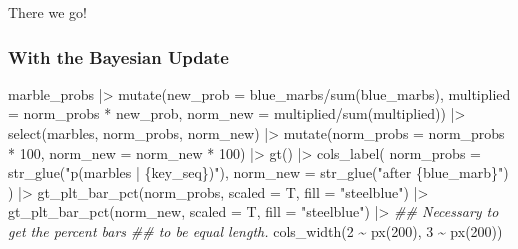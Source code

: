 \documentclass[
  letterpaper,
  DIV=11,
  numbers=noendperiod]{scrartcl}
\newenvironment{Shaded}{\begin{snugshade}}{\end{snugshade}}
\newcommand{\AttributeTok}[1]{\textcolor[rgb]{0.40,0.45,0.13}{#1}}
\newcommand{\DecValTok}[1]{\textcolor[rgb]{0.68,0.00,0.00}{#1}}
\newcommand{\DocumentationTok}[1]{\textcolor[rgb]{0.37,0.37,0.37}{\textit{#1}}}
\newcommand{\FunctionTok}[1]{\textcolor[rgb]{0.28,0.35,0.67}{#1}}
\newcommand{\NormalTok}[1]{\textcolor[rgb]{0.00,0.23,0.31}{#1}}
\newcommand{\SpecialCharTok}[1]{\textcolor[rgb]{0.37,0.37,0.37}{#1}}
\newcommand{\StringTok}[1]{\textcolor[rgb]{0.13,0.47,0.30}{#1}}
\begin{document}
There we go!

\hypertarget{with-the-bayesian-update}{%
\subsubsection{With the Bayesian
Update}\label{with-the-bayesian-update}}

\begin{Shaded}
\begin{Highlighting}[]
\NormalTok{marble\_probs }\SpecialCharTok{|\textgreater{}} 
  \FunctionTok{mutate}\NormalTok{(}\AttributeTok{new\_prob =}\NormalTok{ blue\_marbs}\SpecialCharTok{/}\FunctionTok{sum}\NormalTok{(blue\_marbs),}
         \AttributeTok{multiplied =}\NormalTok{ norm\_probs }\SpecialCharTok{*}\NormalTok{ new\_prob,}
         \AttributeTok{norm\_new =}\NormalTok{ multiplied}\SpecialCharTok{/}\FunctionTok{sum}\NormalTok{(multiplied)) }\SpecialCharTok{|\textgreater{}} 
  \FunctionTok{select}\NormalTok{(marbles, norm\_probs, norm\_new) }\SpecialCharTok{|\textgreater{}} 
  \FunctionTok{mutate}\NormalTok{(}\AttributeTok{norm\_probs =}\NormalTok{ norm\_probs }\SpecialCharTok{*} \DecValTok{100}\NormalTok{,}
         \AttributeTok{norm\_new =}\NormalTok{ norm\_new }\SpecialCharTok{*} \DecValTok{100}\NormalTok{) }\SpecialCharTok{|\textgreater{}} 
  \FunctionTok{gt}\NormalTok{() }\SpecialCharTok{|\textgreater{}} 
  \FunctionTok{cols\_label}\NormalTok{(}
    \AttributeTok{norm\_probs =} \FunctionTok{str\_glue}\NormalTok{(}\StringTok{"p(marbles | \{key\_seq\})"}\NormalTok{),}
    \AttributeTok{norm\_new =} \FunctionTok{str\_glue}\NormalTok{(}\StringTok{"after \{blue\_marb\}"}\NormalTok{)}
\NormalTok{  ) }\SpecialCharTok{|\textgreater{}} 
  \FunctionTok{gt\_plt\_bar\_pct}\NormalTok{(norm\_probs, }
                 \AttributeTok{scaled =}\NormalTok{ T, }
                 \AttributeTok{fill =} \StringTok{"steelblue"}\NormalTok{) }\SpecialCharTok{|\textgreater{}} 
  \FunctionTok{gt\_plt\_bar\_pct}\NormalTok{(norm\_new, }
                 \AttributeTok{scaled =}\NormalTok{ T, }
                 \AttributeTok{fill =} \StringTok{"steelblue"}\NormalTok{) }\SpecialCharTok{|\textgreater{}} 
  \DocumentationTok{\#\# Necessary to get the percent bars}
  \DocumentationTok{\#\# to be equal length.}
  \FunctionTok{cols\_width}\NormalTok{(}\DecValTok{2} \SpecialCharTok{\textasciitilde{}} \FunctionTok{px}\NormalTok{(}\DecValTok{200}\NormalTok{),}
             \DecValTok{3} \SpecialCharTok{\textasciitilde{}} \FunctionTok{px}\NormalTok{(}\DecValTok{200}\NormalTok{))}
\end{Highlighting}
\end{Shaded}
\end{document}
